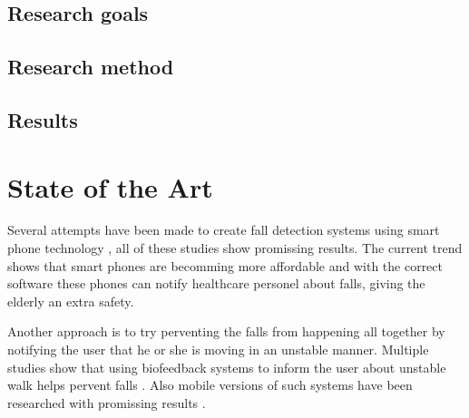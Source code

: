 \documentclass[11pt,twoside,a4paper]{report}
\begin{document}
\section{Research goals}

\section{Research method}

\section{Results}


\chapter{State of the Art}

Several attempts have been made to create fall detection systems using smart phone technology \cite{fall detection articles}, all of these studies show promissing results. The current trend shows that smart phones are becomming more affordable \cite{find some data about sales and decreasing prices} and with the correct software these phones can notify healthcare personel about falls, giving the elderly an extra safety.

Another approach is to try perventing the falls from happening all together by notifying the user that he or she is moving in an unstable manner. Multiple studies show that using biofeedback systems to inform the user about unstable walk helps pervent falls \cite{the articles that svanæs gave us}. Also mobile versions of such systems have been researched with promissing results \cite{article about mobile pervension of falls}.
\end{document}

